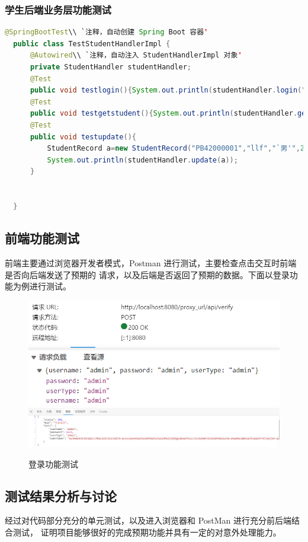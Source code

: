 \documentclass[12pt, a4paper]{article}
\begin{document}
\subsubsection{学生后端业务层功能测试}
\begin{lstlisting}[language=Java]
  @SpringBootTest\\ `注释，自动创建 Spring Boot 容器'
  public class TestStudentHandlerImpl {
      @Autowired\\ `注释，自动注入 StudentHandlerImpl 对象'
      private StudentHandler studentHandler;
      @Test
      public void testlogin(){System.out.println(studentHandler.login("PB42000001","123456"));}
      @Test
      public void testgetstudent(){System.out.println(studentHandler.getStudent("PB42000001"));}
      @Test
      public void testupdate(){
          StudentRecord a=new StudentRecord("PB42000001","llf","`男'",21,"cs","123456");
          System.out.println(studentHandler.update(a));
      }
  
  
  }

\end{lstlisting}

\subsection{前端功能测试}
前端主要通过浏览器开发者模式，Postman 进行测试，主要检查点击交互时前端是否向后端发送了预期的
请求，以及后端是否返回了预期的数据。下面以登录功能为例进行测试。
\begin{figure}[H]
	\centering
	\includegraphics[width = 0.6 \textwidth]{loginRe.png}
	\includegraphics[width = 0.6 \textwidth]{loginPayload}
	\includegraphics[width = 0.9 \textwidth]{response}
	\caption{登录功能测试}
\end{figure}

\subsection{测试结果分析与讨论}
经过对代码部分充分的单元测试，以及进入浏览器和 PostMan 进行充分前后端结合测试，
证明项目能够很好的完成预期功能并具有一定的对意外处理能力。
\end{document}
